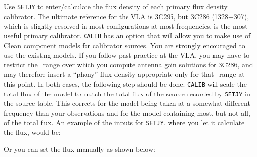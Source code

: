     Use {\tt SETJY} to enter/calculate the flux density of each
primary flux density calibrator.  The ultimate reference for the VLA
is 3C295, but 3C286 (1328+307), which is slightly resolved in most
configurations at most frequencies, is the most useful primary
calibrator.  {\tt CALIB} has an option that will allow you to make use
of Clean component models for calibrator sources.  You are strongly
encouraged to use the existing models.  If you follow past practice
at the VLA, you may have to restrict the \uv\ range over which you
compute antenna gain solutions for 3C286, and may therefore insert a
``phony'' flux density appropriate only for that \uv\ range at this
point.  In both cases, the following step should be done.  {\tt CALIB}
will scale the total flux of the model to match the total flux of the
source recorded by {\tt SETJY} in the source table.  This corrects for
the model being taken at a somewhat different frequency than your
observations and for the model containing most, but not all, of the
total flux.  An example of the inputs for {\tt SETJY}, where you let
it calculate the flux, would be:

Or you can set the flux manually as shown below:

